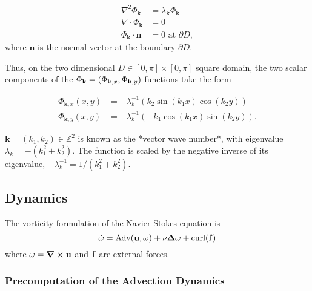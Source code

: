 \begin{align*}
\nabla^2 \Phi_{\textbf{k}} &= \lambda_{\textbf{k}}\Phi_{\textbf{k}} \\
\nabla \cdot \Phi_{\textbf{k}} &= 0 \\
\Phi_{\textbf{k}} \cdot \textbf{n} &= 0 \text{ at } \partial D,
\end{align*}
where $\textbf{n}$ is the normal vector at the boundary $\partial D$.

Thus, on the two dimensional $D \in [0, \pi] \times [0, \pi]$ square domain, the
two scalar components of the $\Phi_{\vb{k}} =(\Phi_{\vb{k}, x},
\Phi_{\vb{k},y})$ functions take the form 

\begin{align*}
\Phi_{\textbf{k},x}(x, y) &= -\lambda_k^{-1} 
    ( k_2 \sin(k_1 x) \cos(k_2 y) ) \\
\Phi_{\textbf{k},y}(x, y) &= -\lambda_k^{-1}
    ( -k_1 \cos(k_1 x) \sin(k_2 y) ).
\end{align*}

$\textbf{k} = (k_1, k_2) \in \mathbb{Z}^2$ is known as the *vector wave
number*, with eigenvalue $\lambda_k = -(k_1^2 + k_2^2)$. 
The function is scaled by the negative inverse of its eigenvalue, 
$-\lambda_k^{-1} = 1/(k_1^2 + k_2^2)$.

\subsection*{Dynamics}
The vorticity formulation of the Navier-Stokes equation is
\begin{equation}\label{eq:NSE-vorticity}
    \dot{\bf{\omega}} = \text{Adv}(\bf{u}, \bf{\omega}) + \nu \Delta\bf{\omega}
    + \text{curl}(\bf{f})
\end{equation}
where $\bf{\omega} = \curl{\bf{u}}$ and $\bf{f}$ are external forces.

\subsubsection*{Precomputation of the Advection Dynamics}
\todo{}





















